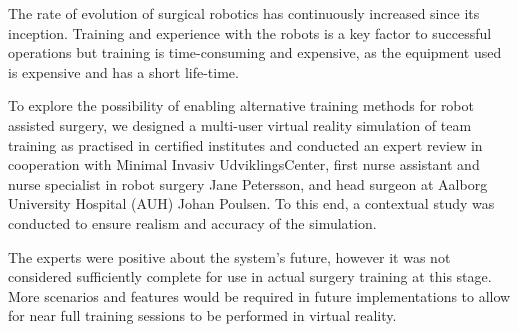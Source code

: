 The rate of evolution of surgical robotics has continuously increased since its inception. Training and experience with the robots is a key factor to successful operations but training is time-consuming and expensive, as the equipment used is expensive and has a short life-time.

To explore the possibility of enabling alternative training methods for robot assisted surgery, we designed a multi-user virtual reality simulation of team training as practised in certified institutes and conducted an expert review in cooperation with Minimal Invasiv UdviklingsCenter, first nurse assistant and nurse specialist in robot surgery Jane Petersson, and head surgeon at Aalborg University Hospital (AUH) Johan Poulsen. To this end, a contextual study was conducted to ensure realism and accuracy of the simulation.

The experts were positive about the system's future, however it was not considered sufficiently complete for use in actual surgery training at this stage. More scenarios and features would be required in future implementations to allow for near full training sessions to be performed in virtual reality.